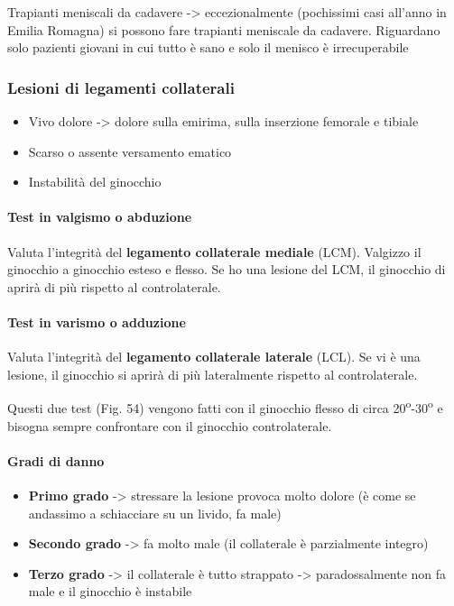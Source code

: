 Trapianti meniscali da cadavere -> eccezionalmente (pochissimi casi all'anno in Emilia Romagna) si possono fare trapianti meniscale da cadavere. Riguardano solo pazienti giovani in cui tutto è sano e solo il menisco è irrecuperabile

\subsubsection{Lesioni di legamenti collaterali }

\begin{itemize}
\item
  Vivo dolore -> dolore sulla emirima, sulla inserzione femorale e tibiale
\item
  Scarso o assente versamento ematico
\item
  Instabilità del ginocchio
\end{itemize}

\paragraph{Test in valgismo o abduzione }

Valuta l'integrità del \textbf{legamento collaterale mediale} (LCM).
Valgizzo il ginocchio a ginocchio esteso e flesso. Se ho una lesione del LCM, il ginocchio di aprirà di più rispetto al controlaterale.

\paragraph{Test in varismo o adduzione }

Valuta l'integrità del \textbf{legamento collaterale laterale} (LCL). Se vi è una lesione, il ginocchio si aprirà di più lateralmente rispetto al controlaterale.

Questi due test (Fig. 54) vengono fatti con il ginocchio flesso di circa
20\textsuperscript{o}-30\textsuperscript{o} e bisogna sempre confrontare con il ginocchio controlaterale.

\paragraph{Gradi di danno}

\begin{itemize}
\item
  \textbf{Primo grado} -> stressare la lesione provoca molto dolore (è come se andassimo a schiacciare su un livido, fa male)
\item
  \textbf{Secondo grado} -> fa molto male (il collaterale è parzialmente integro)
\item
  \textbf{Terzo grado} -> il collaterale è tutto strappato -> paradossalmente non fa male e il ginocchio è instabile
\end{itemize}

